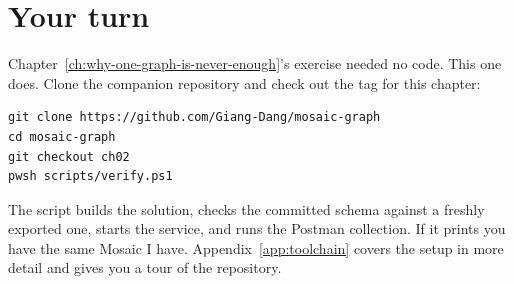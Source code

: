 \section*{Your turn}

Chapter~\ref{ch:why-one-graph-is-never-enough}'s exercise needed no code. This
one does. Clone the companion repository and check out the tag for this chapter:

\begin{verbatim}
git clone https://github.com/Giang-Dang/mosaic-graph
cd mosaic-graph
git checkout ch02
pwsh scripts/verify.ps1
\end{verbatim}

The script builds the solution, checks the committed schema against a freshly
exported one, starts the service, and runs the Postman collection. If it prints
 you have the same Mosaic I have. Appendix~\ref{app:toolchain} covers
the setup in more detail and gives you a tour of the repository.

